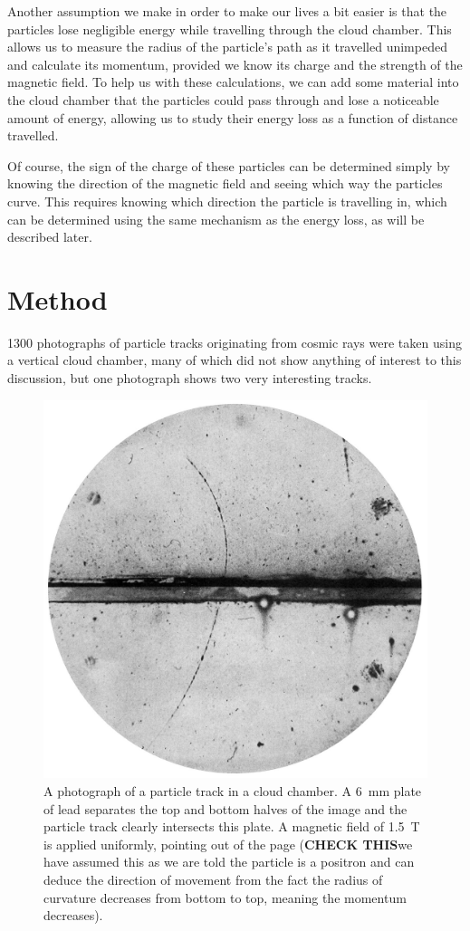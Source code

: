 \documentclass[11pt]{article}
\numberwithin{equation}{section}
\numberwithin{figure}{section}
\numberwithin{table}{section}
\begin{document}
Another assumption we make in order to make our lives a bit easier is that the particles lose negligible energy while travelling through the cloud chamber. This allows us to measure the radius of the particle's path as it travelled unimpeded and calculate its momentum, provided we know its charge and the strength of the magnetic field. To help us with these calculations, we can add some material into the cloud chamber that the particles could pass through and lose a noticeable amount of energy, allowing us to study their energy loss as a function of distance travelled. 

Of course, the sign of the charge of these particles can be determined simply by knowing the direction of the magnetic field and seeing which way the particles curve. This requires knowing which direction the particle is travelling in, which can be determined using the same mechanism as the energy loss, as will be described later. 

\section{Method}\label{sec:Method}
1300 photographs of particle tracks originating from cosmic rays were taken using a vertical cloud chamber, many of which did not show anything of interest to this discussion, but one photograph shows two very interesting tracks.

\begin{figure}[h]
    \begin{center}
        \includegraphics[width=.6\textwidth]{Plots/positron_track.jpg}
        \caption{A photograph of a particle track in a cloud chamber. A \SI{6}{\milli\metre} plate of lead separates the top and bottom halves of the image and the particle track clearly intersects this plate. A magnetic field of \SI{1.5}{\tesla} is applied uniformly, pointing out of the page (\textbf{CHECK THIS}we have assumed this as we are told the particle is a positron and can deduce the direction of movement from the fact the radius of curvature decreases from bottom to top, meaning the momentum decreases). }
        \label{fig:positron_track}
    \end{center}
\end{figure}


\newpage
\printbibliography
\end{document}
